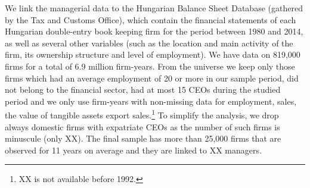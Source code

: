 \documentclass[12pt,a4paper]{article}
\begin{document}
We link the managerial data to the Hungarian Balance Sheet Database (gathered by the Tax and Customs Office), which contain the financial statements of each Hungarian double-entry book keeping firm for the period between 1980 and 2014, as well as several other variables (such as the location and main activity of the firm, its ownership structure and level of employment).  We have data on 819,000 firms for a total of 6.9 million firm-years. From the universe we keep only those firms which had an average employment of 20 or more in our sample period, did not belong to the financial sector, had at most 15 CEOs during the studied period and we only use firm-years with non-missing data for employment, sales, the value of tangible assets export sales.\footnote{XX is not available before 1992.} To simplify the analysis, we drop always domestic firms with expatriate CEOs as the number of such firms is minuscule (only XX). The final sample has more than 25,000 firms that are observed for 11 years on average and they are linked to XX managers.

\end{document}
